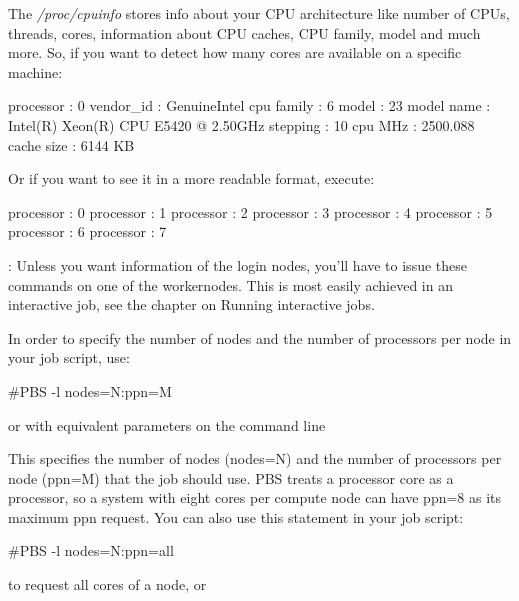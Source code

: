 The \emph{/proc/cpuinfo} stores info about your CPU architecture like number of
CPUs, threads, cores, information about CPU caches, CPU family, model and much
more.  So, if you want to detect how many cores are available on a specific
machine:

\begin{prompt}
processor       : 0
vendor_id       : GenuineIntel
cpu family      : 6
model           : 23
model name      : Intel(R) Xeon(R) CPU  E5420  @ 2.50GHz
stepping        : 10
cpu MHz         : 2500.088
cache size      : 6144 KB
\end{prompt}

Or if you want to see it in a more readable format, execute:

\begin{prompt}
processor : 0
processor : 1
processor : 2
processor : 3
processor : 4
processor : 5
processor : 6
processor : 7
\end{prompt}

: Unless you want information of the login nodes, you'll have to issue these commands
on one of the workernodes. This is most easily achieved in an interactive job, see the chapter on
Running interactive jobs.

In order to specify the number of nodes and the number of processors per node in your job script, use:

\begin{prompt}
#PBS -l nodes=N:ppn=M
\end{prompt}

or with equivalent parameters on the command line

\begin{prompt}
\end{prompt}

This specifies the number of nodes (nodes=N) and the number of processors per
node (ppn=M) that the job should use. PBS treats a processor core as a
processor, so a system with eight cores per compute node can have ppn=8 as its
maximum ppn request.
\ifantwerpen
\else
  You can also use this statement in your job script:

\begin{prompt}
#PBS -l nodes=N:ppn=all
\end{prompt}

  to request all cores of a node, or


